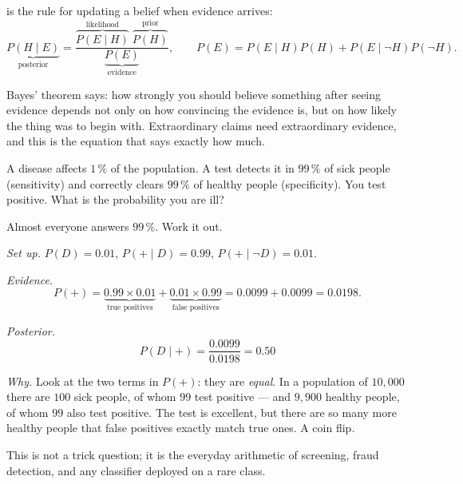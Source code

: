  is the rule for updating a belief when evidence
arrives:
\begin{equation}
  \underbrace{P(H\mid E)}_{\text{posterior}}
  = \frac{\overbrace{P(E\mid H)}^{\text{likelihood}}\;
          \overbrace{P(H)}^{\text{prior}}}
         {\underbrace{P(E)}_{\text{evidence}}},
  \qquad
  P(E) = P(E\mid H)P(H) + P(E\mid\neg H)P(\neg H).
  \label{eq:math-bayes}
\end{equation}

\begin{plainlanguage}
Bayes' theorem says: how strongly you should believe something after seeing
evidence depends not only on how convincing the evidence is, but on how likely
the thing was to begin with. Extraordinary claims need extraordinary evidence,
and this is the equation that says exactly how much.
\end{plainlanguage}

\begin{workedexample}
A disease affects $1\,\%$ of the population. A test detects it in $99\,\%$ of
sick people (sensitivity) and correctly clears $99\,\%$ of healthy people
(specificity). You test positive. What is the probability you are ill?

Almost everyone answers $99\,\%$. Work it out.

\emph{Set up.} $P(D) = 0.01$, $P(+\mid D) = 0.99$, $P(+\mid\neg D) = 0.01$.

\emph{Evidence.}
\[
  P(+) = \underbrace{0.99\times0.01}_{\text{true positives}}
       + \underbrace{0.01\times0.99}_{\text{false positives}}
       = 0.0099 + 0.0099 = 0.0198 .
\]

\emph{Posterior.}
\[
  P(D\mid +) = \frac{0.0099}{0.0198} = \boxed{0.50}
\]

\emph{Why.} Look at the two terms in $P(+)$: they are \emph{equal}. In a
population of $10{,}000$ there are $100$ sick people, of whom $99$ test
positive --- and $9{,}900$ healthy people, of whom $99$ also test positive.
The test is excellent, but there are so many more healthy people that false
positives exactly match true ones. A coin flip.

This is not a trick question; it is the everyday arithmetic of screening,
fraud detection, and any classifier deployed on a rare class.
\end{workedexample}

